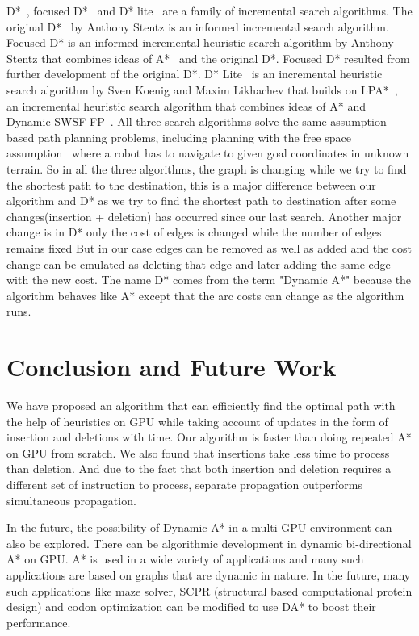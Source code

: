 \documentclass[a4paper]{article}
\begin{document}
D*~\cite{original_D_star}, focused D*~\cite{focused_D_star} and D* lite~\cite{D_star_lite} are a family of incremental search algorithms. The original D*~\cite{original_D_star} by Anthony Stentz is an informed incremental search algorithm. Focused D*\cite{focused_D_star} is an informed incremental heuristic search algorithm by Anthony Stentz that combines ideas of A*~\cite{A*} and the original D*\cite{original_D_star}. Focused D* resulted from further development of the original D*. D* Lite~\cite{D_star_lite} is an incremental heuristic search algorithm by Sven Koenig and Maxim Likhachev that builds on LPA*~\cite{LPA*}, an incremental heuristic search algorithm that combines ideas of A* and Dynamic SWSF-FP~\cite{SPP}. All three search algorithms solve the same assumption-based path planning problems, including planning with the free space assumption~\cite{PF} where a robot has to navigate to given goal coordinates in unknown terrain. So in all the three algorithms, the graph is changing while we try to find the shortest path to the destination, this is a major difference between our algorithm and D* as we try to find the shortest path to destination after some changes(insertion + deletion) has occurred since our last search. Another major change is in D* only the cost of edges is changed while the number of edges remains fixed But in our case edges can be removed as well as added and the cost change can be emulated as deleting that edge and later adding the same edge with the new cost. The name D* comes from the term "Dynamic A*" because the algorithm behaves like A* except that the arc costs can change as the algorithm runs.

\section{Conclusion and Future Work}\label{sec:future_work}
We have proposed an algorithm that can efficiently find the optimal path with the help of heuristics on GPU while taking account of updates in the form of insertion and deletions with time. Our algorithm is faster than doing repeated A* on GPU from scratch. We also found that insertions take less time to process than deletion. And due to the fact that both insertion and deletion requires a different set of instruction to process, separate propagation outperforms simultaneous propagation.

In the future, the possibility of Dynamic A* in a multi-GPU environment can also be explored. There can be algorithmic development in dynamic bi-directional A* on GPU. A* is used in a wide variety of applications and many such applications are based on graphs that are dynamic in nature. In the future, many such applications like maze solver, SCPR (structural based computational protein design) and codon optimization can be modified to use DA* to boost their performance.
\end{document}
